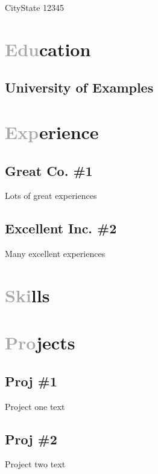 \documentclass[11pt, a4paper]{coding-resume}
\begin{document}
\address{123 Street}{City}{State 12345}

\newcommand{\sectTitleStyle}{darkgray}


\section{\textcolor{\sectTitleStyle}{Edu}cation}
\subsection{University of Examples}
\section{\textcolor{\sectTitleStyle}{Exp}erience}
\subsection{Great Co. \#1}
Lots of great experiences
\subsection{Excellent Inc. \#2}
Many excellent experiences
\section{\textcolor{\sectTitleStyle}{Ski}lls}
\section{\textcolor{\sectTitleStyle}{Pro}jects}
\subsection{Proj \#1}
Project one text
\subsection{Proj \#2}
Project two text
\end{document}
